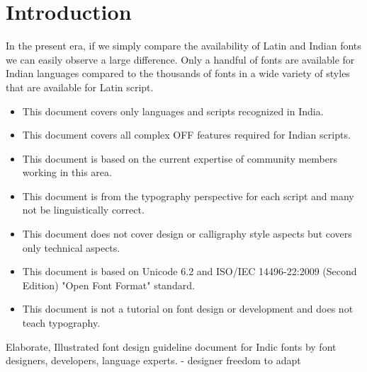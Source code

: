 \chapter{Introduction}



In the present era, if we simply compare the availability of Latin and Indian fonts we can easily observe a large difference. Only a handful of fonts are available for Indian languages compared to the thousands of fonts in a wide  variety of styles that are available for Latin script.



\begin{itemize}
\item This document covers only languages and scripts recognized in India.
\item This document covers all complex OFF features required for Indian scripts.
\item This document is based on the current expertise of community members working in this area.
\item This document is from the typography perspective for each script and many not be linguistically correct.
\item This document does not cover design or calligraphy style aspects but covers only technical aspects.
\item This document is based on Unicode 6.2 and ISO/IEC 14496-22:2009 (Second Edition) "Open Font Format" standard.
\item This document is not a tutorial on font design or development and does not teach typography.
\end{itemize}


Elaborate, Illustrated font design guideline document for Indic fonts by font designers, developers, language experts.
- designer freedom to adapt


